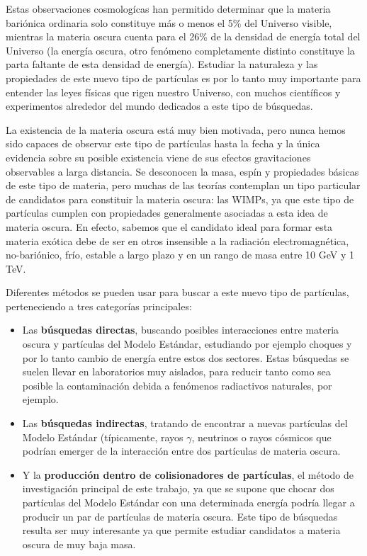 \documentclass[a4paper, 10pt, openright]{report}
\begin{document}
\begin{appendices}
Estas observaciones cosmolog\'{i}cas han permitido determinar que la materia bari\'{o}nica ordinaria solo constituye m\'{a}s o menos el 5\% del Universo visible, mientras la materia oscura cuenta para el 26\% de la densidad de energ\'{i}a total del Universo (la energ\'{i}a oscura, otro fen\'{o}meno completamente distinto constituye la parta faltante de esta densidad de energ\'{i}a). Estudiar la naturaleza y las propiedades de este nuevo tipo de part\'{i}culas es por lo tanto muy importante para entender las leyes f\'{i}sicas que rigen nuestro Universo, con muchos cient\'{i}ficos y experimentos alrededor del mundo dedicados a este tipo de b\'{u}squedas.

La existencia de la materia oscura est\'{a} muy bien motivada, pero nunca hemos sido capaces de observar este tipo de part\'{i}culas hasta la fecha y la \'{u}nica evidencia sobre su posible existencia viene de sus efectos gravitaciones observables a larga distancia. Se desconocen la masa, esp\'{i}n y propiedades b\'{a}sicas de este tipo de materia, pero muchas de las teor\'{i}as contemplan un tipo particular de candidatos para constituir la materia oscura: las \acfp{WIMP}, ya que este tipo de part\'{i}culas cumplen con propiedades generalmente asociadas a esta idea de materia oscura. En efecto, sabemos que el candidato ideal para formar esta materia ex\'{o}tica debe de ser en otros insensible a la radiaci\'{o}n electromagn\'{e}tica, no-bari\'{o}nico, fr\'{i}o, estable a largo plazo y en un rango de masa entre 10 GeV y 1 TeV.

Diferentes m\'{e}todos se pueden usar para buscar a este nuevo tipo de part\'{i}culas, perteneciendo a tres categor\'{i}as principales:
\begin{itemize}
\item Las \textbf{b\'{u}squedas directas}, buscando posibles interacciones entre materia oscura y part\'{i}culas del Modelo Est\'{a}ndar, estudiando por ejemplo choques y por lo tanto cambio de energ\'{i}a entre estos dos sectores. Estas b\'{u}squedas se suelen llevar en laboratorios muy aislados, para reducir tanto como sea posible la contaminaci\'{o}n debida a fen\'{o}menos radiactivos naturales, por ejemplo.
\item Las \textbf{b\'{u}squedas indirectas}, tratando de encontrar a nuevas part\'{i}culas del Modelo Est\'{a}ndar (t\'{i}picamente, rayos $\gamma$, neutrinos o rayos c\'{o}smicos que podr\'{i}an emerger de la interacci\'{o}n entre dos part\'{i}culas de materia oscura.
\item Y la \textbf{producci\'{o}n dentro de colisionadores de part\'{i}culas}, el m\'{e}todo de investigaci\'{o}n principal de este trabajo, ya que se supone que chocar dos part\'{i}culas del Modelo Est\'{a}ndar con una determinada energ\'{i}a podr\'{i}a llegar a producir un par de part\'{i}culas de materia oscura. Este tipo de b\'{u}squedas resulta ser muy interesante ya que permite estudiar candidatos a materia oscura de muy baja masa.
\end{itemize}


\end{appendices}
\end{document}
